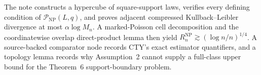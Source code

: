 The note constructs a hypercube of square-support laws, verifies every defining condition of \(\mathcal P_{\mathrm{NP}}(L,q)\), and proves adjacent compressed Kullback--Leibler divergence at most \(\alpha\log M_n\).  A marked-Poisson cell decomposition and the coordinatewise overlap direct-product lemma then yield \(R_n^{\mathrm{NP}}\gtrsim(\log n/n)^{1/4}\).  A source-backed comparator node records CTY's exact estimator quantifiers, and a topology lemma records why Assumption~2 cannot supply a full-class upper bound for the Theorem~6 support-boundary problem.